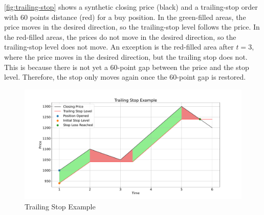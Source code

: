 \autoref{fig:trailing-stop} shows a synthetic closing price (black) and a trailing-stop order with 60 points distance (red) for a buy position.
In the green-filled areas, the price moves in the desired direction, so the trailing-stop level follows the price.
In the red-filled areas, the prices do not move in the desired direction, so the trailing-stop level does not move.
An exception is the red-filled area after $t=3$, where the price moves in the desired direction, but the trailing stop does not.
This is because there is not yet a 60-point gap between the price and the stop level.
Therefore, the stop only moves again once the 60-point gap is restored.

\begin{figure}[H]
    \centering
    \includegraphics[width=\textwidth]{images/trading-engine/trailing-stop}
    \caption{Trailing Stop Example}
    \label{fig:trailing-stop}
\end{figure}


